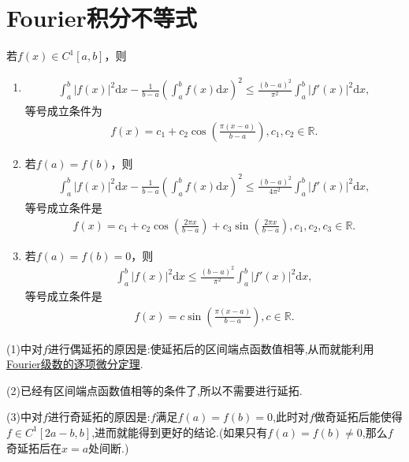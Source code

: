 \documentclass[../../main.tex]{subfiles}
\begin{document}
\section{Fourier积分不等式}

\begin{theorem}[Fourier型积分不等式]\label{theorem:Fourier型积分不等式}
若$f(x)\in C^1[a,b]$，则
\begin{enumerate}[(1)]
\item \begin{align*}
\int_{a}^{b} |f(x)|^2 \mathrm{d}x - \frac{1}{b - a} \left( \int_{a}^{b} f(x) \mathrm{d}x \right)^2 \leq \frac{(b - a)^2}{\pi^2} \int_{a}^{b} |f'(x)|^2 \mathrm{d}x,
\end{align*}
等号成立条件为
\begin{align*}
f(x) = c_1 + c_2 \cos\left( \frac{\pi(x - a)}{b - a} \right), c_1, c_2 \in \mathbb{R}.
\end{align*}

\item 若$f(a) = f(b)$，则
\begin{align*}
\int_{a}^{b} |f(x)|^2 \mathrm{d}x - \frac{1}{b - a} \left( \int_{a}^{b} f(x) \mathrm{d}x \right)^2 \leq \frac{(b - a)^2}{4\pi^2} \int_{a}^{b} |f'(x)|^2 \mathrm{d}x,
\end{align*}
等号成立条件是
\begin{align*}
f(x) = c_1 + c_2 \cos\left( \frac{2\pi x}{b - a} \right) + c_3 \sin\left( \frac{2\pi x}{b - a} \right), c_1, c_2, c_3 \in \mathbb{R}.
\end{align*}

\item 若$f(a) = f(b) = 0$，则
\begin{align*}
\int_{a}^{b} |f(x)|^2 \mathrm{d}x \leq \frac{(b - a)^2}{\pi^2} \int_{a}^{b} |f'(x)|^2 \mathrm{d}x,
\end{align*}
等号成立条件是
\begin{align*}
f(x) = c \sin\left( \frac{\pi (x - a)}{b - a} \right), c \in \mathbb{R}.
\end{align*} 
\end{enumerate}
\end{theorem}
\begin{remark}
(1)中对$f$进行偶延拓的原因是:使延拓后的区间端点函数值相等,从而就能利用\hyperref[theorem:Fourier级数的逐项微分定理]{Fourier级数的逐项微分定理}.

(2)已经有区间端点函数值相等的条件了,所以不需要进行延拓.

(3)中对$f$进行奇延拓的原因是:$f$满足$f(a)=f(b)=0$,此时对$f$做奇延拓后能使得$f\in C^1[2a-b,b]$,进而就能得到更好的结论.(如果只有$f(a)=f(b)\ne0$,那么$f$奇延拓后在$x=a$处间断.)
\end{remark}
\end{document}
